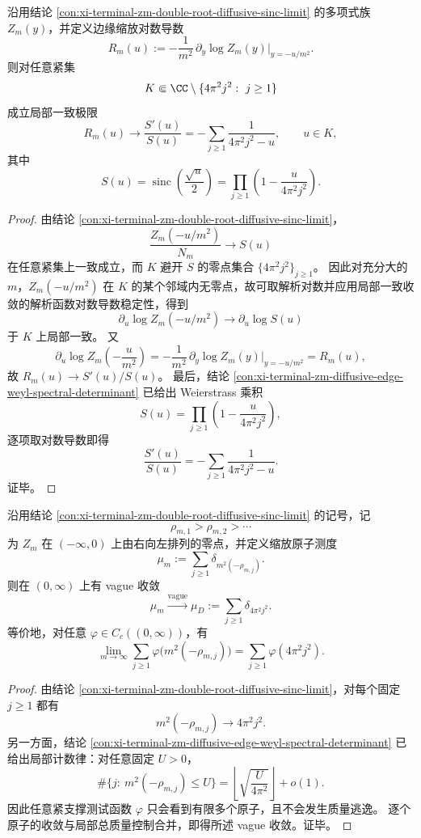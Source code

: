 \begin{theorem}\label{thm:conclusion-leyang-edge-log-derivative-dirichlet-resolvent-limit}
沿用结论 \ref{con:xi-terminal-zm-double-root-diffusive-sinc-limit} 的多项式族 \(Z_m(y)\)，并定义边缘缩放对数导数
\[
R_m(u):=
-\frac{1}{m^2}\,\partial_y\log Z_m(y)\Big|_{y=-u/m^2}.
\]
则对任意紧集
\[
K\Subset \CC\setminus \{4\pi^2j^2:\ j\ge 1\}
\]
成立局部一致极限
\[
R_m(u)\longrightarrow \frac{S'(u)}{S(u)}
=-\sum_{j\ge 1}\frac{1}{4\pi^2j^2-u},
\qquad u\in K,
\]
其中
\[
S(u)=\operatorname{sinc}\!\left(\frac{\sqrt u}{2}\right)
=\prod_{j\ge 1}\left(1-\frac{u}{4\pi^2j^2}\right).
\]
\end{theorem}
\begin{proof}
由结论 \ref{con:xi-terminal-zm-double-root-diffusive-sinc-limit}，
\[
\frac{Z_m(-u/m^2)}{N_m}\longrightarrow S(u)
\]
在任意紧集上一致成立，而 \(K\) 避开 \(S\) 的零点集合 \(\{4\pi^2j^2\}_{j\ge1}\)。
因此对充分大的 \(m\)，\(Z_m(-u/m^2)\) 在 \(K\) 的某个邻域内无零点，故可取解析对数并应用局部一致收敛的解析函数对数导数稳定性，得到
\[
\partial_u\log Z_m(-u/m^2)\longrightarrow \partial_u\log S(u)
\]
于 \(K\) 上局部一致。
又
\[
\partial_u\log Z_m\!\left(-\frac{u}{m^2}\right)
=
-\frac{1}{m^2}\,\partial_y\log Z_m(y)\Big|_{y=-u/m^2}
=R_m(u),
\]
故 \(R_m(u)\to S'(u)/S(u)\)。
最后，结论 \ref{con:xi-terminal-zm-diffusive-edge-weyl-spectral-determinant} 已给出 Weierstrass 乘积
\[
S(u)=\prod_{j\ge 1}\left(1-\frac{u}{4\pi^2j^2}\right),
\]
逐项取对数导数即得
\[
\frac{S'(u)}{S(u)}=-\sum_{j\ge 1}\frac{1}{4\pi^2j^2-u}.
\]
证毕。
\end{proof}

\begin{theorem}\label{thm:conclusion-leyang-edge-zero-measure-dirichlet-clock-convergence}
沿用结论 \ref{con:xi-terminal-zm-double-root-diffusive-sinc-limit} 的记号，记
\[
\rho_{m,1}>\rho_{m,2}>\cdots
\]
为 \(Z_m\) 在 \((-\infty,0)\) 上由右向左排列的零点，并定义缩放原子测度
\[
\mu_m:=\sum_{j\ge 1}\delta_{m^2(-\rho_{m,j})}.
\]
则在 \((0,\infty)\) 上有 vague 收敛
\[
\mu_m \xrightarrow{\mathrm{vague}} \mu_D:=\sum_{j\ge 1}\delta_{4\pi^2j^2}.
\]
等价地，对任意 \(\varphi\in C_c((0,\infty))\)，有
\[
\lim_{m\to\infty}\sum_{j\ge1}\varphi\!\bigl(m^2(-\rho_{m,j})\bigr)
=
\sum_{j\ge1}\varphi(4\pi^2j^2).
\]
\end{theorem}
\begin{proof}
由结论 \ref{con:xi-terminal-zm-double-root-diffusive-sinc-limit}，对每个固定 \(j\ge1\) 都有
\[
m^2(-\rho_{m,j})\longrightarrow 4\pi^2j^2.
\]
另一方面，结论 \ref{con:xi-terminal-zm-diffusive-edge-weyl-spectral-determinant} 已给出局部计数律：对任意固定 \(U>0\)，
\[
\#\{j:\ m^2(-\rho_{m,j})\le U\}
=
\left\lfloor \sqrt{\frac{U}{4\pi^2}}\right\rfloor+o(1).
\]
因此任意紧支撑测试函数 \(\varphi\) 只会看到有限多个原子，且不会发生质量逃逸。
逐个原子的收敛与局部总质量控制合并，即得所述 vague 收敛。证毕。
\end{proof}


